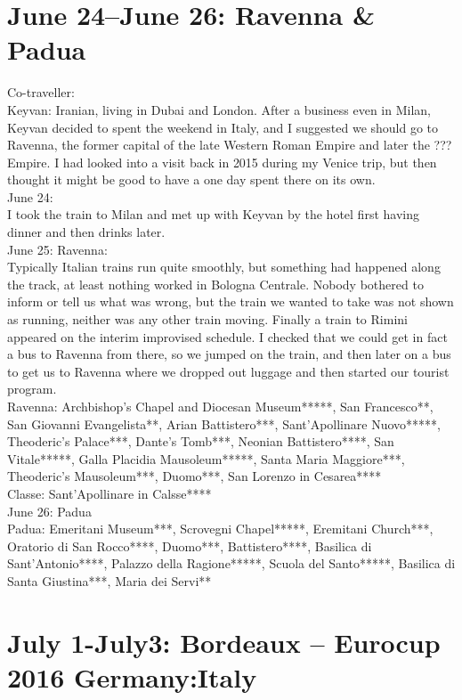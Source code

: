 \section{June 24--June 26: Ravenna \& Padua}
\label{RavennaPadua}

Co-traveller:\\
Keyvan: Iranian, living in Dubai and London. After a business even in Milan, Keyvan decided to spent the weekend in Italy, and I suggested we should go to Ravenna, the former capital of the late Western Roman Empire and later the ??? Empire. I had looked into a visit back in 2015 during my Venice trip, but then thought it might be good to have a one day spent there on its own.\\

June 24: \\
I took the train to Milan and met up with Keyvan by the hotel first having dinner and then drinks later.\\

June 25: Ravenna:\\
Typically Italian trains run quite smoothly, but something had happened along the track, at least nothing worked in Bologna Centrale. Nobody bothered to inform or tell us what was wrong, but the train we wanted to take was not shown as running, neither was any other train moving. Finally a train to Rimini appeared on the interim improvised schedule. I checked that we could get in fact a bus to Ravenna from there, so we jumped on the train, and then later on a bus to get us to Ravenna where we dropped out luggage and then started our tourist program.\\

Ravenna: Archbishop's Chapel and Diocesan Museum*****, San Francesco**, San Giovanni Evangelista**, Arian Battistero***, Sant'Apollinare Nuovo*****, Theoderic's Palace***, Dante's Tomb***, Neonian Battistero****, San Vitale*****, Galla Placidia Mausoleum*****, Santa Maria Maggiore***, Theoderic's Mausoleum***, Duomo***, San Lorenzo in Cesarea****\\
Classe: Sant'Apollinare in Calsse****\\

June 26: Padua\\
Padua: Emeritani Museum***, Scrovegni Chapel*****, Eremitani Church***, Oratorio di San Rocco****, Duomo***, Battistero****, Basilica di Sant'Antonio****, Palazzo della Ragione*****, Scuola del Santo*****, Basilica di Santa Giustina***, Maria dei Servi**

\section{July 1-July3: Bordeaux -- Eurocup 2016 Germany:Italy}
\label{2016:Bordeaux}

